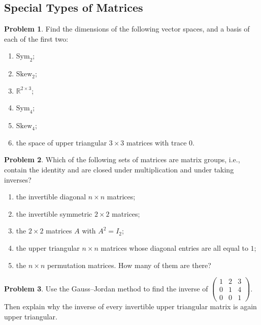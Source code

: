 \documentclass[11pt]{article}
\theoremstyle{definition}
\newtheorem{problem}{Problem}[section]
\begin{document}
\subsection{Special Types of Matrices}

\begin{problem}\label{pr:dims-special}
    Find the dimensions of the following vector spaces, and a basis of each of the first two:
    \begin{enumerate}[label=(\alph*)]
        \item $\mathrm{Sym}_2$;
        \item $\mathrm{Skew}_2$;
        \item $\mathbb{R}^{2 \times 3}$;
        \item $\mathrm{Sym}_4$;
        \item $\mathrm{Skew}_4$;
        \item the space of upper triangular $3 \times 3$ matrices with trace $0$.
    \end{enumerate}
\end{problem}

\begin{problem}\label{pr:groups}
    Which of the following sets of matrices are matrix groups, i.e., contain the identity and are closed under multiplication and under taking inverses?
    \begin{enumerate}[label=(\alph*)]
        \item the invertible diagonal $n \times n$ matrices;
        \item the invertible symmetric $2 \times 2$ matrices;
        \item the $2 \times 2$ matrices $A$ with $A^2 = I_2$;
        \item the upper triangular $n \times n$ matrices whose diagonal entries are all equal to $1$;
        \item the $n \times n$ permutation matrices. How many of them are there?
    \end{enumerate}
\end{problem}

\begin{problem}\label{pr:inverse-triangular}
    Use the Gauss--Jordan method to find the inverse of $\begin{pmatrix} 1 & 2 & 3 \\ 0 & 1 & 4 \\ 0 & 0 & 1 \end{pmatrix}$. Then explain why the inverse of every invertible upper triangular matrix is again upper triangular.
\end{problem}
\end{document}
